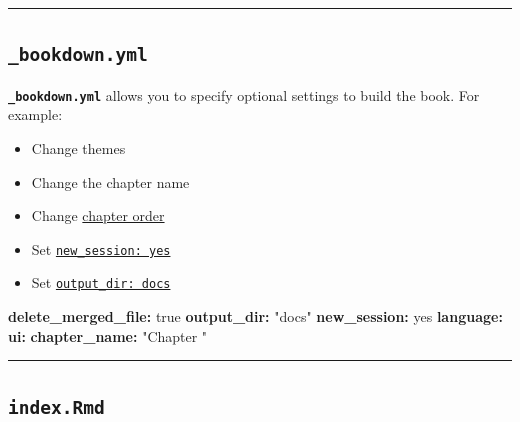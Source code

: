 \documentclass[
  a4paper,
  twoside,
  openright]{book}
\newenvironment{Shaded}{\begin{snugshade}}{\end{snugshade}}
\newcommand{\AttributeTok}[1]{\textcolor[rgb]{0.13,0.29,0.53}{#1}}
\newcommand{\CharTok}[1]{\textcolor[rgb]{0.31,0.60,0.02}{#1}}
\newcommand{\FunctionTok}[1]{\textcolor[rgb]{0.13,0.29,0.53}{\textbf{#1}}}
\newcommand{\KeywordTok}[1]{\textcolor[rgb]{0.13,0.29,0.53}{\textbf{#1}}}
\newcommand{\StringTok}[1]{\textcolor[rgb]{0.31,0.60,0.02}{#1}}
\providecommand{\tightlist}{%
  \setlength{\itemsep}{0pt}\setlength{\parskip}{0pt}}
\theoremstyle{definition}
\theoremstyle{definition}
\theoremstyle{definition}
\theoremstyle{definition}
\theoremstyle{remark}
\begin{document}
\begin{center}\rule{0.5\linewidth}{0.5pt}\end{center}

\subsection*{\texorpdfstring{\texttt{\_bookdown.yml}}{\_bookdown.yml}}\label{bookdown.yml}

\textbf{\texttt{\_bookdown.yml}} allows you to specify optional settings to build the book. For example:

\begin{itemize}
\tightlist
\item
  Change themes
\item
  Change the chapter name
\item
  Change \href{https://rstudio4edu.github.io/rstudio4edu-book/book-yours.html\#book-order}{chapter order}
\item
  Set \href{https://rstudio4edu.github.io/rstudio4edu-book/make-book.html\#book-output}{\texttt{new\_session:\ yes}}
\item
  Set \href{https://rstudio4edu.github.io/rstudio4edu-book/make-book.html\#book-output}{\texttt{output\_dir:\ docs}}
\end{itemize}

\begin{Shaded}
\begin{Highlighting}[]
\FunctionTok{delete\_merged\_file}\KeywordTok{:}\AttributeTok{ }\CharTok{true}
\FunctionTok{output\_dir}\KeywordTok{:}\AttributeTok{ }\StringTok{"docs"}
\FunctionTok{new\_session}\KeywordTok{:}\AttributeTok{ }\CharTok{yes}
\FunctionTok{language}\KeywordTok{:}
\AttributeTok{  }\FunctionTok{ui}\KeywordTok{:}
\AttributeTok{    }\FunctionTok{chapter\_name}\KeywordTok{:}\AttributeTok{ }\StringTok{"Chapter "}
\end{Highlighting}
\end{Shaded}

\begin{center}\rule{0.5\linewidth}{0.5pt}\end{center}

\subsection*{\texorpdfstring{\texttt{index.Rmd}}{index.Rmd}}\label{index.rmd}
\end{document}
